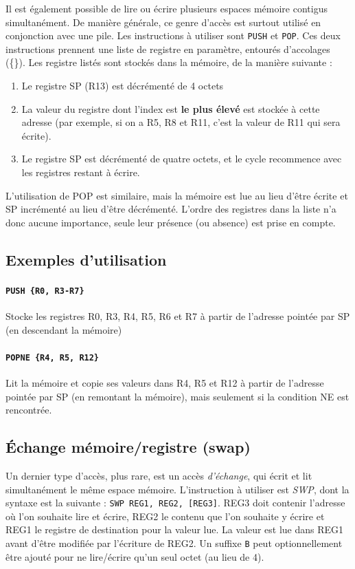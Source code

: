 \documentclass{tufte-handout}
\begin{document}
Il est également possible de lire ou écrire plusieurs espaces mémoire contigus simultanément. De manière générale, ce genre d'accès est surtout utilisé en conjonction avec une pile. Les instructions à utiliser sont \texttt{PUSH} et \texttt{POP}. Ces deux instructions prennent une liste de registre en paramètre, entourés d'accolages (\{\}). Les registre listés sont stockés dans la mémoire, de la manière suivante :
\begin{enumerate}
	\item Le registre SP (R13) est décrémenté de 4 octets
	\item La valeur du registre dont l'index est \textbf{le plus élevé} est stockée à cette adresse (par exemple, si on a R5, R8 et R11, c'est la valeur de R11 qui sera écrite).
	\item Le registre SP est décrémenté de quatre octets, et le cycle recommence avec les registres restant à écrire.
\end{enumerate}
L'utilisation de POP est similaire, mais la mémoire est lue au lieu d'être écrite et SP incrémenté au lieu d'être décrémenté. L'ordre des registres dans la liste n'a donc aucune importance, seule leur présence (ou absence) est prise en compte.

\subsection{Exemples d'utilisation}

\paragraph{\texttt{PUSH \{R0, R3-R7\}}} Stocke les registres R0, R3, R4, R5, R6 et R7 à partir de l'adresse pointée par SP (en descendant la mémoire)

\paragraph{\texttt{POPNE \{R4, R5, R12\}}} Lit la mémoire et copie ses valeurs dans R4, R5 et R12 à partir de l'adresse pointée par SP (en remontant la mémoire), mais seulement si la condition NE est rencontrée.

\subsection{Échange mémoire/registre (swap)}

Un dernier type d'accès, plus rare, est un accès \textit{d'échange}, qui écrit et lit simultanément le même espace mémoire. L'instruction à utiliser est \textit{SWP}, dont la syntaxe est la suivante : \texttt{SWP REG1, REG2, [REG3]}. REG3 doit contenir l'adresse où l'on souhaite lire et écrire, REG2 le contenu que l'on souhaite y écrire et REG1 le registre de destination pour la valeur lue. La valeur est lue dans REG1 avant d'être modifiée par l'écriture de REG2. Un suffixe \texttt{B} peut optionnellement être ajouté pour ne lire/écrire qu'un seul octet (au lieu de 4).
\end{document}
